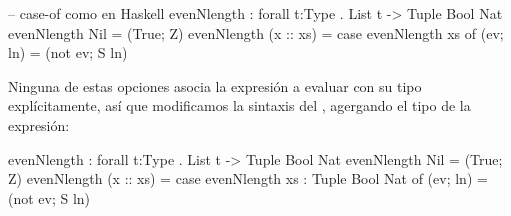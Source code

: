 {\begin{designfr}
\begin{anglercode}[morekeywords={pattern}]
-- case-of como en Haskell
evenNlength : forall t:Type . List t -> Tuple Bool Nat
evenNlength Nil = (True; Z)
evenNlength (x :: xs) =
    case evenNlength xs of
        (ev; ln) = (not ev; S ln)
\end{anglercode}

Ninguna de estas opciones asocia la expresión a evaluar con su tipo explícitamente, así que modificamos la sintaxis del , agergando el tipo de la expresión:

\begin{anglercode}
evenNlength : forall t:Type . List t -> Tuple Bool Nat
evenNlength Nil = (True; Z)
evenNlength (x :: xs) =
    case evenNlength xs : Tuple Bool Nat of
        (ev; ln) = (not ev; S ln)
\end{anglercode}
\end{designfr}

}
